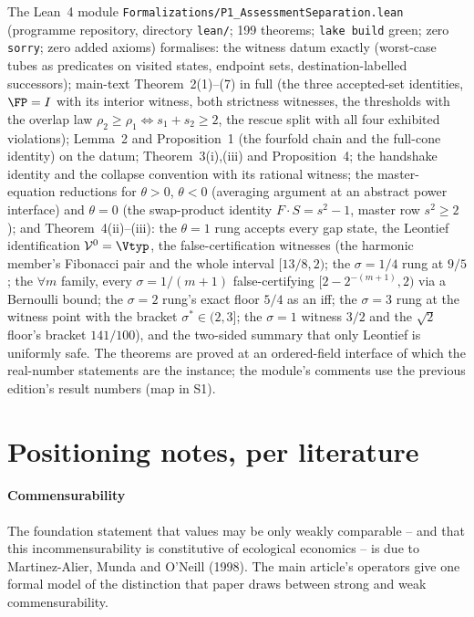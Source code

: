 The Lean~4 module \texttt{Formalizations/P1\_AssessmentSeparation.lean} (programme repository, directory \texttt{lean/}; 199 theorems; \texttt{lake build} green; zero \texttt{sorry}; zero added axioms) formalises: the witness datum exactly (worst-case tubes as predicates on visited states, endpoint sets, destination-labelled successors); main-text Theorem~2(1)--(7) in full (the three accepted-set identities, $\FP=I$ with its interior witness, both strictness witnesses, the thresholds with the overlap law $\rho_2\ge\rho_1\iff s_1+s_2\ge2$, the rescue split with all four exhibited violations); Lemma~2 and Proposition~1 (the fourfold chain and the full-cone identity) on the datum; Theorem~3(i),(iii) and Proposition~4; the handshake identity and the collapse convention with its rational witness; the master-equation reductions for $\theta>0$, $\theta<0$ (averaging argument at an abstract power interface) and $\theta=0$ (the swap-product identity $F\cdot S=s^2-1$, master row $s^2\ge2$); and Theorem~4(ii)--(iii): the $\theta=1$ rung accepts every gap state, the Leontief identification $\mathcal V^0=\Vtyp$, the false-certification witnesses (the harmonic member's Fibonacci pair and the whole interval $[13/8,2)$; the $\sigma=1/4$ rung at $9/5$; the $\forall m$ family, every $\sigma=1/(m+1)$ false-certifying $[2-2^{-(m+1)},2)$ via a Bernoulli bound; the $\sigma=2$ rung's exact floor $5/4$ as an iff; the $\sigma=3$ rung at the witness point with the bracket $\sigma^*\in(2,3]$; the $\sigma=1$ witness $3/2$ and the $\sqrt2$ floor's bracket $141/100$), and the two-sided summary that only Leontief is uniformly safe. The theorems are proved at an ordered-field interface of which the real-number statements are the instance; the module's comments use the previous edition's result numbers (map in S1).

\section{Positioning notes, per literature}\label{si:positioning}

\paragraph{Commensurability} The foundation statement that values may be only weakly comparable -- and that this incommensurability is constitutive of ecological economics -- is due to Martinez-Alier, Munda and O'Neill (1998). The main article's operators give one formal model of the distinction that paper draws between strong and weak commensurability.

